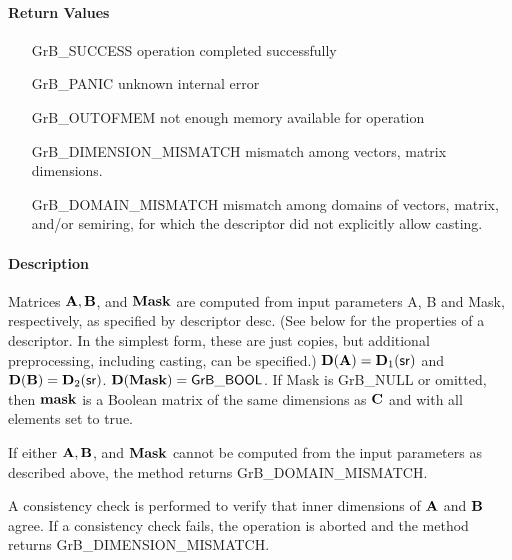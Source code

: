 \paragraph{Return Values}

\begin{itemize}[leftmargin=2.1in]
\item[{\sf GrB\_SUCCESS}]             operation completed successfully
\item[{\sf GrB\_PANIC}]               unknown internal error
\item[{\sf GrB\_OUTOFMEM}]            not enough memory available for operation
\item[{\sf GrB\_DIMENSION\_MISMATCH}] mismatch among vectors, matrix dimensions.
\item[{\sf GrB\_DOMAIN\_MISMATCH}]    mismatch among domains of vectors, matrix, and/or semiring, for which the descriptor did not explicitly allow casting.
\end{itemize}


\paragraph{Description}

Matrices ${\bf A}, {\bf B}$, and ${\bf Mask}$ are computed from
input parameters {\sf A}, {\sf B} and {\sf Mask}, respectively, as specified
by descriptor {\sf desc}. (See below for the properties of a descriptor. In
the simplest form, these are just copies, but additional preprocessing,
including casting, can be specified.)  $\bold{D}({\bf A}) =
\bold{D}_1({\sf sr})$ and $\bold{D}({\bf B}) = \bold{D}_2({\sf sr})$.
$\bold{D}({\bf Mask}) = {\sf GrB\_BOOL}$.  If {\sf Mask} is {\sf GrB\_NULL} or omitted,
then ${\bf mask}$ is a Boolean matrix of the same dimensions as ${\bf C}$
and with all elements set to {\sf true}.

If either ${\bf A}, {\bf B}$, and ${\bf Mask}$  cannot be computed
from the input parameters as described above, the method returns {\sf
GrB\_DOMAIN\_MISMATCH}.

A consistency check is performed to verify that inner dimensions of ${\bf A}$ and ${\bf B}$ agree. 
If a consistency check fails, the operation is
aborted and the method returns {\sf GrB\_DIMENSION\_MISMATCH}.



